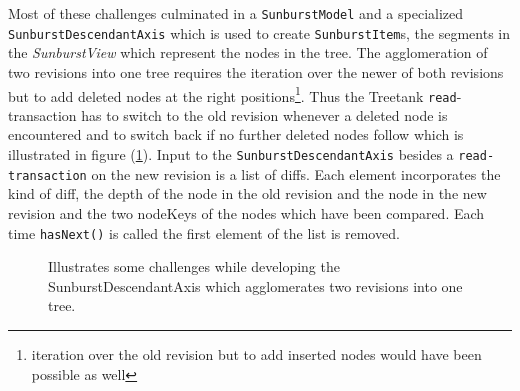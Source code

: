\documentclass{llncs}
\begin{document}
Most of these challenges culminated in a \texttt{SunburstModel} and a specialized \texttt{SunburstDescendantAxis} which is used to create \texttt{SunburstItem}s, the segments in the \emph{SunburstView} which represent the nodes in the tree. The agglomeration of two revisions into one tree requires the iteration over the newer of both revisions but to add deleted nodes at the right positions\footnote{iteration over the old revision but to add inserted nodes would have been possible as well}. Thus the Treetank \texttt{read}-transaction has to switch to the old revision whenever a deleted node is encountered and to switch back if no further deleted nodes follow which is illustrated in figure (\ref{fig:tree-axis}). Input to the \texttt{SunburstDescendantAxis} besides a \texttt{read-transaction} on the new revision is a list of diffs. Each element incorporates the kind of diff, the depth of the node in the old revision and the node in the new revision and the two nodeKeys of the nodes which have been compared. Each time \texttt{hasNext()} is called the first element of the list is removed.

\begin{figure}[htb]
\caption{\label{fig:tree-axis} Illustrates some challenges while developing the SunburstDescendantAxis which agglomerates two revisions into one tree.}
\end{figure}
\end{document}
